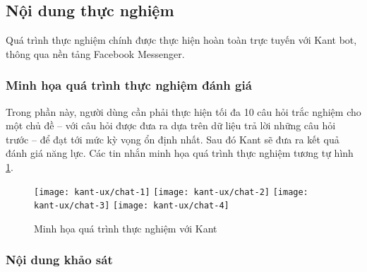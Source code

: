 \subsection{Nội dung thực nghiệm}
Quá trình thực nghiệm chính được thực hiện hoàn toàn trực tuyến với Kant bot, thông qua nền tảng Facebook Messenger.\par

\subsubsection{Minh họa quá trình thực nghiệm đánh giá}
Trong phần này, người dùng cần phải thực hiện tối đa 10 câu hỏi trắc nghiệm cho một chủ đề – với câu hỏi được đưa ra dựa trên dữ liệu trả lời những câu hỏi trước – để đạt tới mức kỳ vọng ổn định nhất. Sau đó Kant sẽ đưa ra kết quả đánh giá năng lực. Các tin nhắn minh họa quá trình thực nghiệm tương tự hình \ref{fig:fig-c4-chatbot-demo}.
\begin{figure}[htb!]\centering
	\texttt{[image: kant-ux/chat-1]}
	\texttt{[image: kant-ux/chat-2]}
	\texttt{[image: kant-ux/chat-3]}
	\texttt{[image: kant-ux/chat-4]}
	\caption{Minh họa quá trình thực nghiệm với Kant}
	\label{fig:fig-c4-chatbot-demo}
\end{figure}\par

\subsubsection{Nội dung khảo sát}


